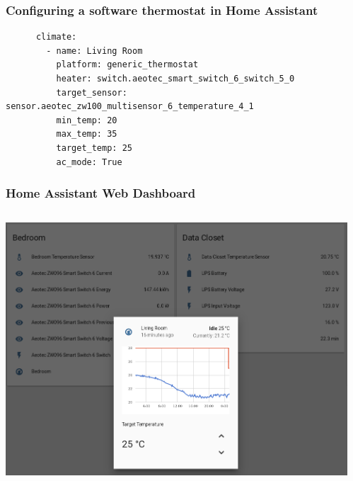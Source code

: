 \documentclass[aspectratio=169,11pt,hyperref={colorlinks=true}]{beamer}
\begin{document}
\begin{frame}[fragile=singleslide]
    \frametitle{Configuring a software thermostat in Home Assistant}
    \begin{verbatim}
      climate:
        - name: Living Room
          platform: generic_thermostat
          heater: switch.aeotec_smart_switch_6_switch_5_0
          target_sensor: sensor.aeotec_zw100_multisensor_6_temperature_4_1
          min_temp: 20
          max_temp: 35
          target_temp: 25
          ac_mode: True
    \end{verbatim}
\end{frame}


\begin{frame}
    \frametitle{Home Assistant Web Dashboard}
    \begin{columns}
        \begin{column}{.48\textwidth}
            \begin{center}
                \includegraphics[width=1.2\textwidth]{Control_panel_trimmed.png}
            \end{center}
        \end{column}
        \begin{column}{.48\textwidth}
            \begin{center}

\end{center}
\end{column}
\end{columns}
\end{frame}
\end{document}
